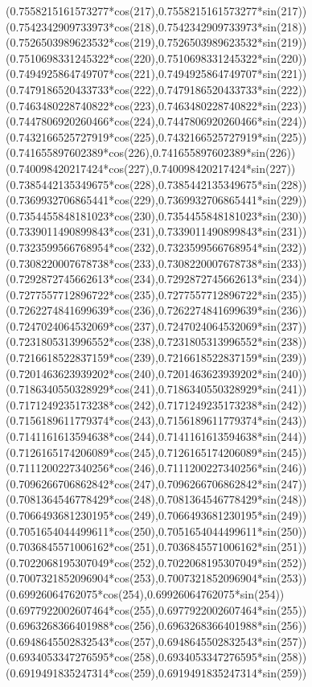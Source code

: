 {({0.7558215161573277*cos(217)},{0.7558215161573277*sin(217)})
({0.7542342909733973*cos(218)},{0.7542342909733973*sin(218)})
({0.7526503989623532*cos(219)},{0.7526503989623532*sin(219)})
({0.7510698331245322*cos(220)},{0.7510698331245322*sin(220)})
({0.7494925864749707*cos(221)},{0.7494925864749707*sin(221)})
({0.7479186520433733*cos(222)},{0.7479186520433733*sin(222)})
({0.7463480228740822*cos(223)},{0.7463480228740822*sin(223)})
({0.7447806920260466*cos(224)},{0.7447806920260466*sin(224)})
({0.7432166525727919*cos(225)},{0.7432166525727919*sin(225)})
({0.741655897602389*cos(226)},{0.741655897602389*sin(226)})
({0.740098420217424*cos(227)},{0.740098420217424*sin(227)})
({0.7385442135349675*cos(228)},{0.7385442135349675*sin(228)})
({0.7369932706865441*cos(229)},{0.7369932706865441*sin(229)})
({0.7354455848181023*cos(230)},{0.7354455848181023*sin(230)})
({0.7339011490899843*cos(231)},{0.7339011490899843*sin(231)})
({0.7323599566768954*cos(232)},{0.7323599566768954*sin(232)})
({0.7308220007678738*cos(233)},{0.7308220007678738*sin(233)})
({0.7292872745662613*cos(234)},{0.7292872745662613*sin(234)})
({0.7277557712896722*cos(235)},{0.7277557712896722*sin(235)})
({0.7262274841699639*cos(236)},{0.7262274841699639*sin(236)})
({0.7247024064532069*cos(237)},{0.7247024064532069*sin(237)})
({0.7231805313996552*cos(238)},{0.7231805313996552*sin(238)})
({0.7216618522837159*cos(239)},{0.7216618522837159*sin(239)})
({0.7201463623939202*cos(240)},{0.7201463623939202*sin(240)})
({0.7186340550328929*cos(241)},{0.7186340550328929*sin(241)})
({0.7171249235173238*cos(242)},{0.7171249235173238*sin(242)})
({0.7156189611779374*cos(243)},{0.7156189611779374*sin(243)})
({0.7141161613594638*cos(244)},{0.7141161613594638*sin(244)})
({0.7126165174206089*cos(245)},{0.7126165174206089*sin(245)})
({0.7111200227340256*cos(246)},{0.7111200227340256*sin(246)})
({0.7096266706862842*cos(247)},{0.7096266706862842*sin(247)})
({0.7081364546778429*cos(248)},{0.7081364546778429*sin(248)})
({0.7066493681230195*cos(249)},{0.7066493681230195*sin(249)})
({0.7051654044499611*cos(250)},{0.7051654044499611*sin(250)})
({0.7036845571006162*cos(251)},{0.7036845571006162*sin(251)})
({0.7022068195307049*cos(252)},{0.7022068195307049*sin(252)})
({0.7007321852096904*cos(253)},{0.7007321852096904*sin(253)})
({0.69926064762075*cos(254)},{0.69926064762075*sin(254)})
({0.6977922002607464*cos(255)},{0.6977922002607464*sin(255)})
({0.6963268366401988*cos(256)},{0.6963268366401988*sin(256)})
({0.6948645502832543*cos(257)},{0.6948645502832543*sin(257)})
({0.6934053347276595*cos(258)},{0.6934053347276595*sin(258)})
({0.6919491835247314*cos(259)},{0.6919491835247314*sin(259)})
}
